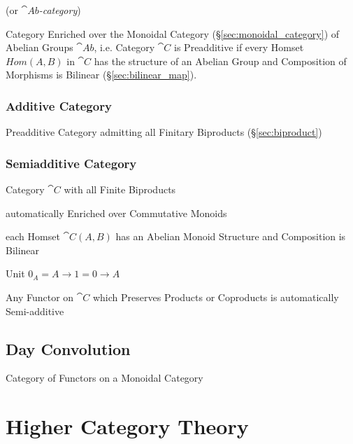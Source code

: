 (or \emph{$\cat{Ab}$-category})

Category Enriched over the Monoidal Category
(\S\ref{sec:monoidal_category}) of Abelian Groups $\cat{Ab}$, i.e.
Category $\cat{C}$ is Preadditive if every Homset $Hom(A,B)$ in
$\cat{C}$ has the structure of an Abelian Group and Composition of
Morphisms is Bilinear (\S\ref{sec:bilinear_map}).



\subsubsection{Additive Category}\label{sec:additive_category}

Preadditive Category admitting all Finitary Biproducts
(\S\ref{sec:biproduct})



\subsubsection{Semiadditive Category}\label{sec:semiadditive_category}

Category $\cat{C}$ with all Finite Biproducts

automatically Enriched over Commutative Monoids

each Homset $\cat{C}(A,B)$ has an Abelian Monoid Structure and
Composition is Bilinear

Unit $0_A = A \rightarrow 1 = 0 \rightarrow A$

Any Functor on $\cat{C}$ which Preserves Products or Coproducts is
automatically Semi-additive



\subsection{Day Convolution}\label{sec:day_convolution}


Category of Functors on a Monoidal Category



\section{Higher Category Theory}\label{sec:higher_category}

